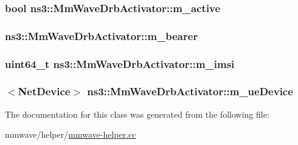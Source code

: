 \subsubsection[{\texorpdfstring{m\+\_\+active}{m_active}}]{\setlength{\rightskip}{0pt plus 5cm}bool ns3\+::\+Mm\+Wave\+Drb\+Activator\+::m\+\_\+active\hspace{0.3cm}{\ttfamily [private]}}\hypertarget{classns3_1_1MmWaveDrbActivator_a2b02d9ef64fb9fc16db808a6667bab4b}{}\label{classns3_1_1MmWaveDrbActivator_a2b02d9ef64fb9fc16db808a6667bab4b}
\subsubsection[{\texorpdfstring{m\+\_\+bearer}{m_bearer}}]{ ns3\+::\+Mm\+Wave\+Drb\+Activator\+::m\+\_\+bearer\hspace{0.3cm}{\ttfamily [private]}}\hypertarget{classns3_1_1MmWaveDrbActivator_a7bc0456aed6a35aa66b25514ec6ca4e6}{}\label{classns3_1_1MmWaveDrbActivator_a7bc0456aed6a35aa66b25514ec6ca4e6}
\subsubsection[{\texorpdfstring{m\+\_\+imsi}{m_imsi}}]{\setlength{\rightskip}{0pt plus 5cm}uint64\+\_\+t ns3\+::\+Mm\+Wave\+Drb\+Activator\+::m\+\_\+imsi\hspace{0.3cm}{\ttfamily [private]}}\hypertarget{classns3_1_1MmWaveDrbActivator_aebc672ea56bcc8c4fb28ec64e4d19ac1}{}\label{classns3_1_1MmWaveDrbActivator_aebc672ea56bcc8c4fb28ec64e4d19ac1}
\subsubsection[{\texorpdfstring{m\+\_\+ue\+Device}{m_ueDevice}}]{$<${\bf Net\+Device}$>$ ns3\+::\+Mm\+Wave\+Drb\+Activator\+::m\+\_\+ue\+Device\hspace{0.3cm}{\ttfamily [private]}}\hypertarget{classns3_1_1MmWaveDrbActivator_a3685adbe2aad9296a29a7d1fbf42546d}{}\label{classns3_1_1MmWaveDrbActivator_a3685adbe2aad9296a29a7d1fbf42546d}


The documentation for this class was generated from the following file\+:\begin{DoxyCompactItemize}
\item 
mmwave/helper/\hyperlink{mmwave-helper_8cc}{mmwave-\/helper.\+cc}\end{DoxyCompactItemize}
